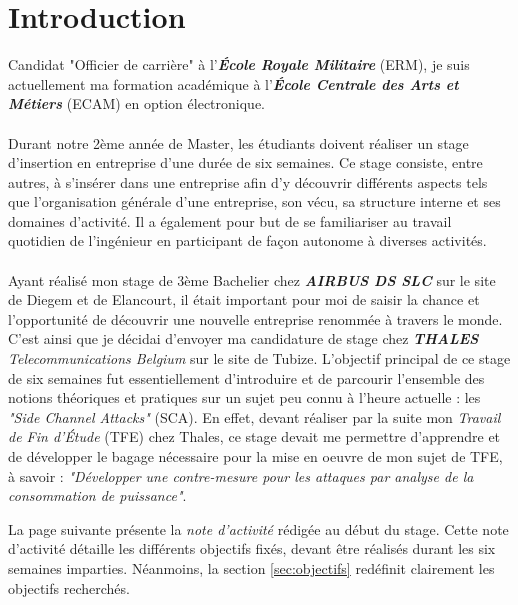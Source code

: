 \documentclass[10pt, oneside, a4paper]{article}
\begin{document}
\tableofcontents
\newpage

\section*{Introduction}


Candidat "Officier de carrière" à l’\textbf{\textit{École Royale Militaire}} (ERM), je suis actuellement ma formation académique à l’\textbf{\textit{École Centrale des Arts et Métiers}} (ECAM) en option électronique. \\ \\
Durant notre 2ème année de Master, les étudiants doivent réaliser un stage d’insertion en entreprise d’une durée de six semaines. Ce stage consiste, entre autres, à s’insérer dans une entreprise afin d’y découvrir différents aspects tels que l’organisation générale d’une entreprise, son vécu, sa structure interne et ses domaines d'activité. Il a également pour but de se familiariser au travail quotidien de l’ingénieur en participant de façon autonome à diverses activités. \\ \\
Ayant réalisé mon stage de 3ème Bachelier chez \textbf{\textit{AIRBUS DS SLC}} sur le site de Diegem et de Elancourt, il était important pour moi de saisir la chance et l’opportunité de découvrir une nouvelle entreprise renommée à travers le monde. C'est ainsi que je décidai d'envoyer ma candidature de stage chez \textit{\textbf{THALES} Telecommunications Belgium} sur le site de Tubize. L'objectif principal de ce stage de six semaines fut essentiellement d'introduire et de parcourir l'ensemble des notions théoriques et pratiques sur un sujet peu connu à l'heure actuelle : les \textit{"Side Channel Attacks"} (SCA). En effet, devant réaliser par la suite mon \textit{Travail de Fin d'Étude} (TFE) chez Thales, ce stage devait me permettre d'apprendre et de développer le bagage nécessaire pour la mise en oeuvre de mon sujet de TFE, à savoir : \textit{"Développer une contre-mesure pour les attaques par analyse de la consommation de puissance"}. \vspace{0.3 cm}

La page suivante présente la \textit{note d'activité} rédigée au début du stage. Cette note d'activité détaille les différents objectifs fixés, devant être réalisés durant les six semaines imparties. Néanmoins, la section \ref{sec:objectifs} redéfinit clairement les objectifs recherchés.
\end{document}
